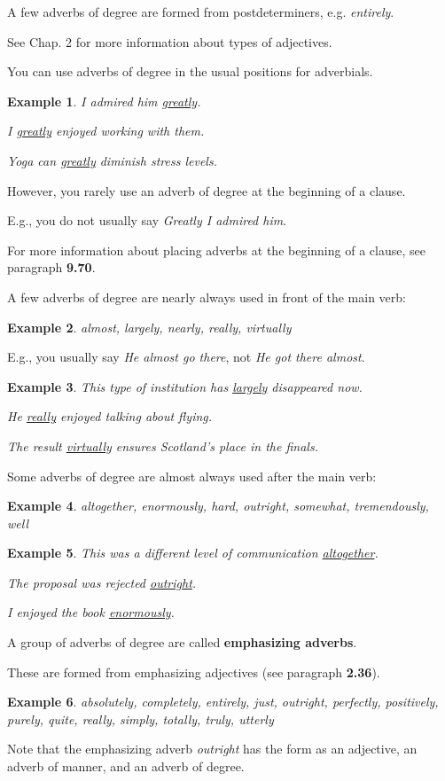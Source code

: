 \documentclass[oneside]{book}
\numberwithin{equation}{section}
\newtheorem{example}{Example}[section]
\begin{document}
%
A few adverbs of degree are formed from postdeterminers, e.g. \textit{entirely}.

%
See Chap. 2 for more information about types of adjectives.

%
\noindent{} You can use adverbs of degree in the usual positions for adverbials.
\begin{example}
    I admired him \underline{greatly}.
    
    I \underline{greatly} enjoyed working with them.
    
    Yoga can \underline{greatly} diminish stress levels.
\end{example}
However, you rarely use an adverb of degree at the beginning of a clause.

E.g., you do not usually say \textit{Greatly I admired him}.

For more information about placing adverbs at the beginning of a clause, see paragraph \textbf{9.70}.

%
A few adverbs of degree are nearly always used in front of the main verb:
\begin{example}
    almost, largely, nearly, really, virtually
\end{example}
E.g., you usually say \textit{He almost go there}, not \textit{He got there almost}.
\begin{example}
    This type of institution has \underline{largely} disappeared now.
    
    He \underline{really} enjoyed talking about flying.
    
    The result \underline{virtually} ensures Scotland's place in the finals.
\end{example}
Some adverbs of degree are almost always used after the main verb:
\begin{example}
    altogether, enormously, hard, outright, somewhat, tremendously, well
\end{example}

\begin{example}
    This was a different level of communication \underline{altogether}.
    
    The proposal was rejected \underline{outright}.
    
    I enjoyed the book \underline{enormously}.
\end{example}
%
\noindent{} A group of adverbs of degree are called \textbf{emphasizing adverbs}.

These are formed from emphasizing adjectives (see paragraph \textbf{2.36}).
\begin{example}
    absolutely, completely, entirely, just, outright, perfectly, positively, purely, quite, really, simply, totally, truly, utterly
\end{example}
Note that the emphasizing adverb \textit{outright} has the form as an adjective, an adverb of manner, and an adverb of degree.
\end{document}
